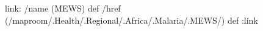 \begin{ingrid}
link:
/name (MEWS) def
/href (/maproom/.Health/.Regional/.Africa/.Malaria/.MEWS/) def
:link
\end{ingrid}
